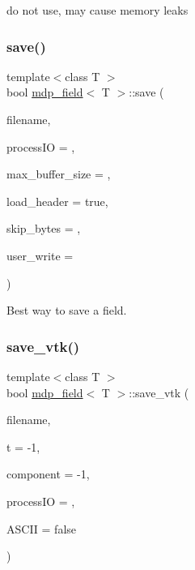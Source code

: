 do not use, may cause memory leaks 

\mbox{\label{classmdp__field_a66bbe9d66cc3ad2a5955282df3519471}} 
\subsubsection{\texorpdfstring{save()}{save()}}
{\footnotesize\ttfamily template$<$class T $>$ \\
bool \hyperlink{classmdp__field}{mdp\+\_\+field}$<$ T $>$\+::save (\begin{DoxyParamCaption}\item[{string}]{filename,  }\item[{int}]{process\+IO = {},  }\item[{\hyperlink{mdp__global__vars_8h_aaa1ad9d0dcd2124aa5af0120d9954174}{mdp\+\_\+int}}]{max\+\_\+buffer\+\_\+size = {},  }\item[{bool}]{load\+\_\+header = {\ttfamily true},  }\item[{\hyperlink{mdp__global__vars_8h_aaa1ad9d0dcd2124aa5af0120d9954174}{mdp\+\_\+int}}]{skip\+\_\+bytes = {},  }\item[{bool($\ast$)(F\+I\+LE $\ast$, void $\ast$, \hyperlink{mdp__global__vars_8h_aaa1ad9d0dcd2124aa5af0120d9954174}{mdp\+\_\+int}, \hyperlink{mdp__global__vars_8h_aaa1ad9d0dcd2124aa5af0120d9954174}{mdp\+\_\+int}, \hyperlink{mdp__global__vars_8h_aaa1ad9d0dcd2124aa5af0120d9954174}{mdp\+\_\+int}, const \hyperlink{classmdp__lattice}{mdp\+\_\+lattice} \&)}]{user\+\_\+write = {} }\end{DoxyParamCaption})}



Best way to save a field. 

\mbox{\label{classmdp__field_a8ad4d41e9c53df910f114031f84e0845}} 
\subsubsection{\texorpdfstring{save\+\_\+vtk()}{save\_vtk()}}
{\footnotesize\ttfamily template$<$class T $>$ \\
bool \hyperlink{classmdp__field}{mdp\+\_\+field}$<$ T $>$\+::save\+\_\+vtk (\begin{DoxyParamCaption}\item[{string}]{filename,  }\item[{int}]{t = {\ttfamily -\/1},  }\item[{int}]{component = {\ttfamily -\/1},  }\item[{int}]{process\+IO = {},  }\item[{bool}]{A\+S\+C\+II = {\ttfamily false} }\end{DoxyParamCaption})}

